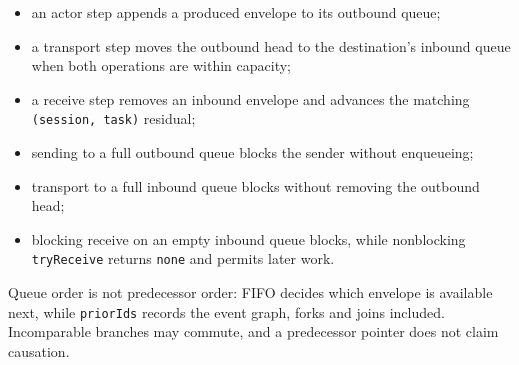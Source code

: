 \begin{itemize}
  \item an actor step appends a produced envelope to its outbound queue;
  \item a transport step moves the outbound head to the destination's inbound
        queue when both operations are within capacity;
  \item a receive step removes an inbound envelope and advances the matching
        \texttt{(session, task)} residual;
  \item sending to a full outbound queue blocks the sender without enqueueing;
  \item transport to a full inbound queue blocks without removing the outbound
        head;
  \item blocking receive on an empty inbound queue blocks, while nonblocking
        \texttt{tryReceive} returns \texttt{none} and permits later work.
\end{itemize}

Queue order is not predecessor order: FIFO decides which envelope is available
next, while \texttt{priorIds} records the event graph, forks and joins included.
Incomparable branches may commute, and a predecessor pointer does not claim
causation.
